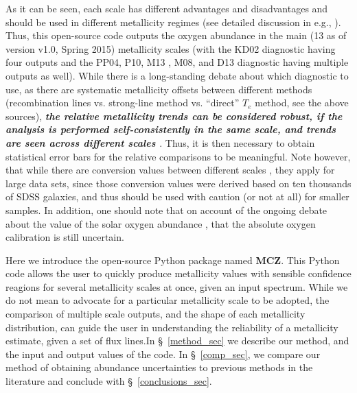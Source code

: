 \documentclass{emulateapj}
\begin{document}
As it can be seen, each scale has different advantages and disadvantages and should be used in different metallicity regimes (see detailed discussion in e.g.,  \citealt{kewley02,stasinska02,kewley08,moustakas10,lopezsanchez12,dopita13,blanc15}). Thus, this open-source code outputs the oxygen abundance in the main (13 as of version v1.0, Spring 2015) metallicity scales (with the KD02 diagnostic having four outputs and the PP04, P10, M13 , M08, and D13  diagnostic having multiple outputs as well). While there is a long-standing debate about which diagnostic to use, as there are systematic metallicity offsets between different methods (recombination lines vs. strong-line method vs. ``direct'' $T_e$ method, see the above sources), \emph{\bf the relative metallicity trends can be considered robust, if the analysis is performed self-consistently in the same scale, and trends are seen across different scales \citep{kewley08,moustakas10}}. Thus, it is then necessary to obtain statistical error bars for the relative comparisons to be meaningful. Note however, that while there are conversion values between different scales \citep{kewley08}, they apply for large data sets, since those conversion values were derived based on ten thousands of SDSS galaxies, and thus should be used with caution (or not at all) for smaller samples.
In addition, one should note that on account of the ongoing debate about the value of the solar oxygen abundance \citep{asplund09_rev,chaffau11}, that the absolute oxygen calibration is still uncertain.



Here we introduce the open-source Python package named \textbf{MCZ}. This Python code allows the user to quickly produce metallicity values with sensible confidence reagions for several metallicity scales at once, given an input spectrum. While we do not mean to advocate for a particular metallicity scale to be adopted, the comparison of multiple scale outputs, and the shape of each metallicity distribution, can guide the user in understanding the reliability of a metallicity estimate, given a set of flux lines.In \S~\ref{method_sec} we describe our method, and the input and output values of the code. In \S~\ref{comp_sec}, we compare our method of obtaining abundance uncertainties to previous methods in the literature and conclude with \S~\ref{conclusions_sec}. 
\end{document}
